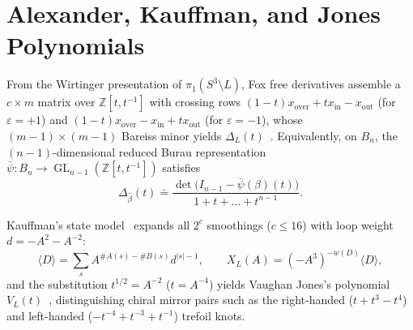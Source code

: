 \documentclass{article}
\begin{document}
\section{Alexander, Kauffman, and Jones Polynomials}

From the Wirtinger presentation of $\pi_1(S^3 \setminus L)$, Fox free derivatives assemble a $c \times m$ matrix over $\mathbb{Z}[t, t^{-1}]$ with crossing rows $(1 - t) x_{\text{over}} + t x_{\text{in}} - x_{\text{out}}$ (for $\varepsilon = +1$) and $(1 - t) x_{\text{over}} - x_{\text{in}} + t x_{\text{out}}$ (for $\varepsilon = -1$), whose $(m - 1) \times (m - 1)$ Bareiss minor yields $\Delta_L(t)$~\cite{alexander1928topological}. Equivalently, on $B_n$, the $(n - 1)$-dimensional reduced Burau representation $\bar{\psi} : B_n \to \operatorname{GL}_{n-1}(\mathbb{Z}[t, t^{-1}])$ satisfies
\[
\Delta_{\hat{\beta}}(t) \doteq \frac{\det\bigl(I_{n-1} - \bar{\psi}(\beta)(t)\bigr)}{1 + t + \dots + t^{n-1}}.
\]

Kauffman's state model~\cite{kauffman1987state} expands all $2^c$ smoothings ($c \le 16$) with loop weight $d = -A^2 - A^{-2}$:
\[
\langle D \rangle = \sum_{s} A^{\#A(s) - \#B(s)} d^{|s| - 1}, \qquad
X_L(A) = (-A^3)^{-w(D)} \langle D \rangle,
\]
and the substitution $t^{1/2} = A^{-2}$ ($t = A^{-4}$) yields Vaughan Jones's polynomial $V_L(t)$~\cite{jones1985polynomial}, distinguishing chiral mirror pairs such as the right-handed ($t + t^3 - t^4$) and left-handed ($-t^{-4} + t^{-3} + t^{-1}$) trefoil knots.



\end{document}
